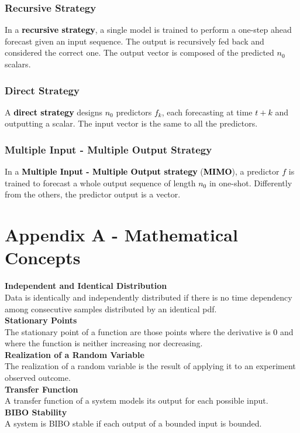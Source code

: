 \documentclass{article}
\newcommand{\bb}[1]{\textcolor{black}{\textbf{#1}}}
\newcommand{\rr}[1]{\textcolor{black}{#1}}
\newcommand{\concept}[1]{\textbf{#1}\vspace{0.2cm}\\}
\begin{document}
\subsubsection{Recursive Strategy}
In a \bb{recursive strategy}, a single model is trained to perform a one-step ahead forecast given an input sequence. The output is recursively fed back and considered the correct one. The output vector is composed of the predicted \rr{$n_0$} scalars.
\subsubsection{Direct Strategy}
A \bb{direct strategy} designs \rr{$n_0$} predictors \rr{$f_k$}, each forecasting at time \rr{$t+k$} and outputting a scalar. The input vector is the same to all the predictors.
\subsubsection{Multiple Input - Multiple Output Strategy}
In a \bb{Multiple Input - Multiple Output strategy} (\bb{MIMO}), a predictor \rr{$f$} is trained to forecast a whole output sequence of length \rr{$n_0$} in one-shot. Differently from the others, the predictor output is a vector.

\newpage

\section{Appendix A - Mathematical Concepts}
\concept{Independent and Identical Distribution}
Data is identically and independently distributed if there is no time dependency among consecutive samples distributed by an identical pdf.
\vspace{0.2cm} \\
\concept{Stationary Points}
The stationary point of a function are those points where the derivative is \rr{$0$} and where the function is neither increasing nor decreasing.
\vspace{0.2cm} \\
\concept{Realization of a Random Variable}
The realization of a random variable is the result of applying it to an experiment observed outcome.
\vspace{0.2cm} \\
\concept{Transfer Function}
A transfer function of a system models its output for each possible input.
\vspace{0.2cm} \\
\concept{BIBO Stability}
A system is BIBO stable if each output of a bounded input is bounded.
\end{document}
